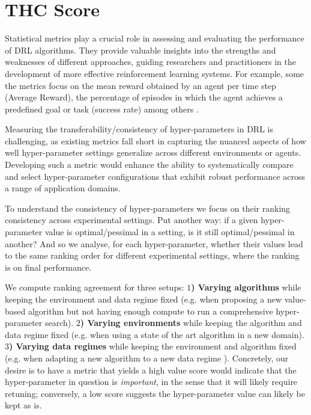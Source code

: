 \section{THC Score}
\label{sec:thc_metric}

Statistical metrics play a crucial role in assessing and evaluating the performance of DRL algorithms. 
They provide valuable insights into the strengths and weaknesses of different approaches, guiding researchers and practitioners in the development of more effective reinforcement learning systems.
For example, some the metrics focus on the mean reward obtained by an agent per time step (Average Reward), the percentage of episodes in which the agent achieves a predefined goal or task (success rate) among others \citep{agarwal2021deep, chan2020measuring, Henderson2017DeepRL}. 

Measuring the transferability/consistency of hyper-parameters in DRL is challenging, as existing metrics fall short in capturing the nuanced aspects of how well hyper-parameter settings generalize across different environments or agents. Developing such a metric would enhance the ability to systematically compare and select hyper-parameter configurations that exhibit robust performance across a range of application domains.

To understand the consistency of hyper-parameters we focus on their ranking consistency across experimental settings. Put another way: if a given hyper-parameter value is optimal/pessimal in a setting, is it still optimal/pessimal in another? And so we analyse, for each hyper-parameter, whether their values lead to the same ranking order for different experimental settings, where the ranking is on final performance. 

We compute ranking agreement for three setups: 
{\bf $1$) Varying algorithms} while keeping the environment and data regime fixed (e.g. when proposing a new value-based algorithm but not having enough compute to run a comprehensive hyper-parameter search). {\bf $2$) Varying environments} while keeping the algorithm and data regime fixed (e.g. when using a state of the art algorithm in a new domain).
{\bf $3$) Varying data regimes} while keeping the environment and algorithm fixed (e.g. when adapting a new algorithm to a new data regime \citep{hasselt19when}).
Concretely, our desire is to have a metric that yields a high value score would indicate that the hyper-parameter in question is {\em important}, in the sense that it will likely require retuning; conversely, a low score suggests the hyper-parameter value can likely be kept as is.

